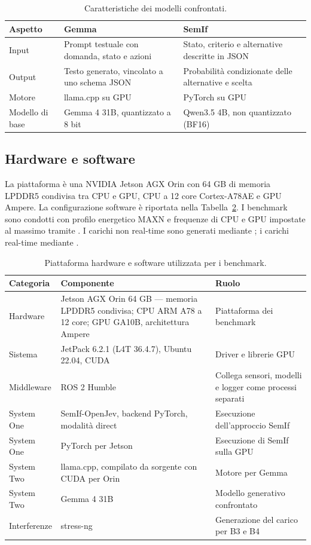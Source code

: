 \documentclass[conference]{IEEEtran}
\newcommand{\code}[1]{\texttt{\detokenize{#1}}}
\begin{document}
\begin{table}[!htbp]
\centering
\caption{Caratteristiche dei modelli confrontati.}\label{tab:models}
\footnotesize

\begin{tabularx}{\columnwidth}{l >{\raggedright\arraybackslash}X >{\raggedright\arraybackslash}X}
\toprule
Aspetto & Gemma & SemIf \\
\midrule
Input & Prompt testuale con domanda, stato e azioni & Stato, criterio e alternative descritte in JSON \\
Output & Testo generato, vincolato a uno schema JSON & Probabilità condizionate delle alternative e scelta \\
Motore & llama.cpp su GPU & PyTorch su GPU \\
Modello di base & Gemma 4 31B, quantizzato a 8 bit & Qwen3.5 4B, non quantizzato (BF16) \\
\bottomrule
\end{tabularx}
\end{table}

\subsection{Hardware e software}
La piattaforma è una NVIDIA Jetson AGX Orin con 64 GB di memoria LPDDR5 condivisa tra CPU e GPU, CPU a 12 core Cortex-A78AE e GPU Ampere. La configurazione software è riportata nella Tabella~\ref{tab:platform}. I benchmark sono condotti con profilo energetico MAXN e frequenze di CPU e GPU impostate al massimo tramite \code{jetson_clocks}. I carichi non real-time sono generati mediante \code{stress-ng}; i carichi real-time mediante \code{rt-app}.

\begin{table}[!htbp]
\centering
\caption{Piattaforma hardware e software utilizzata per i benchmark.}\label{tab:platform}
\footnotesize

\begin{tabularx}{\columnwidth}{l >{\raggedright\arraybackslash}X >{\raggedright\arraybackslash}X}
\toprule
Categoria & Componente & Ruolo \\
\midrule
Hardware & Jetson AGX Orin 64 GB — memoria LPDDR5 condivisa; CPU ARM A78 a 12 core; GPU GA10B, architettura Ampere & Piattaforma dei benchmark \\
Sistema & JetPack 6.2.1 (L4T 36.4.7), Ubuntu 22.04, CUDA & Driver e librerie GPU \\
Middleware & ROS 2 Humble & Collega sensori, modelli e logger come processi separati \\
System One & SemIf-OpenJev, backend PyTorch, modalità direct & Esecuzione dell’approccio SemIf \\
System One & PyTorch per Jetson & Esecuzione di SemIf sulla GPU \\
System Two & llama.cpp, compilato da sorgente con CUDA per Orin & Motore per Gemma \\
System Two & Gemma 4 31B & Modello generativo confrontato \\
Interferenze & stress-ng & Generazione del carico per B3 e B4 \\
\bottomrule
\end{tabularx}
\end{table}
\end{document}
